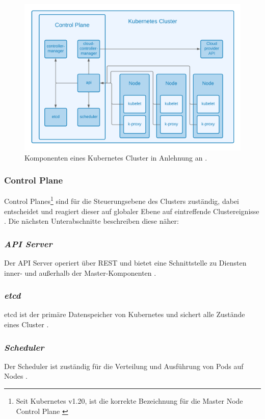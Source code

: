 \begin{figure}
    \centering
    \includegraphics[width=1.0\columnwidth]{images/KubernetesKomponenten.png}
    \caption{Komponenten eines Kubernetes Cluster in Anlehnung an \cite{kuberneteskomponenten}.}
    \label{fig:cluster}
\end{figure}

\subsubsection{Control Plane}
Control Planes\footnote{Seit Kubernetes v1.20, ist die korrekte Bezeichnung für die Master Node Control Plane \cite{Kuberneteschangemaster}} sind für die Steuerungsebene des Clusters zuständig,
dabei entscheidet und reagiert dieser auf globaler Ebene auf eintreffende Clustereignisse \cite{kuberneteskomponenten}.
Die nächsten Unterabschnitte beschreiben diese näher:

\subsubsection{\textit{API Server}}
Der API Server operiert über REST und bietet eine Schnittstelle zu Diensten
inner- und außerhalb der Master-Komponenten \cite{kuberneteskomponenten}.

\subsubsection{\textit{etcd}}
etcd ist der primäre Datenspeicher von Kubernetes und sichert alle Zustände eines
Cluster \cite{kuberneteskomponenten}.

\subsubsection{\textit{Scheduler}}
Der Scheduler ist zuständig für die Verteilung und Ausführung von Pods auf Nodes \cite{kuberneteskomponenten}.

